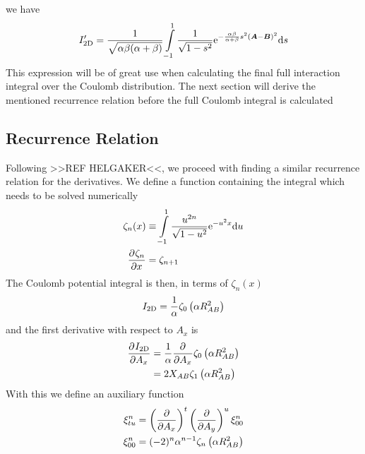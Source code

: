     we have
        \begin{equation}
            I'_{\text{2D}} = \frac{1}{\sqrt{\alpha\beta(\alpha+\beta)}}
            \int\limits^{1}_{-1} \frac{1}{\sqrt{1 - s^2}}
            \mathrm{e}^{-\frac{\alpha\beta}{\alpha + \beta}s^2(\boldsymbol{{A}}-\boldsymbol{{B}})^2}
            \mathrm{d} s
            \label{eq:coulombInteractionSimpleFinal}
        \end{equation}
    This expression will be of great use when calculating the final full
    interaction integral over the Coulomb distribution. The next section will
    derive the mentioned recurrence relation before the full Coulomb integral
    is calculated

\subsection{Recurrence Relation\label{sub:445}}
    Following >>REF HELGAKER<<, we proceed with finding a similar recurrence
    relation for the derivatives. We define a function containing the integral
    which needs to be solved numerically
        \begin{equation}
            \begin{aligned}
                \zeta_n(x) &\equiv \int\limits^1_{-1} \frac{u^{2n}}{\sqrt{1 -
                u^2}} \me^{-u^2x} \md u \\
                \prd{x}[\zeta_n] &= \zeta_{n+1}
            \end{aligned}
            \label{eq:zetaDef}
        \end{equation}
    The Coulomb potential integral is then, in terms of $\zeta_n(x)$
        \begin{equation}
            I_{\text{2D}} = \frac{1}{\alpha} \zeta_0\left(\alpha R^2_{AB}\right)
        \end{equation}
    and the first derivative with respect to $A_x$ is
        \begin{align}
            \prd{A_x}[\twoDI] &= \frac{1}{\alpha} \prd{A_x}
            \zeta_0\left(\alpha R^2_{AB}\right) \nonumber \\
            &= 2X_{AB}\zeta_1\left(\alpha R^2_{AB}\right)
        \end{align}
    With this we define an auxiliary function
        \begin{equation}
            \begin{aligned}
                \xi^n_{tu} &=\left(\frac{\mathrm{\partial}}{\mathrm{\partial} A_x}\right)^{t}\left(\frac{\mathrm{\partial}}{\mathrm{\partial} A_y}\right)^{u} \xi^n_{00} \\
                \xi^n_{00} &= (-2)^n\alpha^{n-1} \zeta_n\left(\alpha
                R^2_{AB}\right)
            \end{aligned}
        \end{equation}
